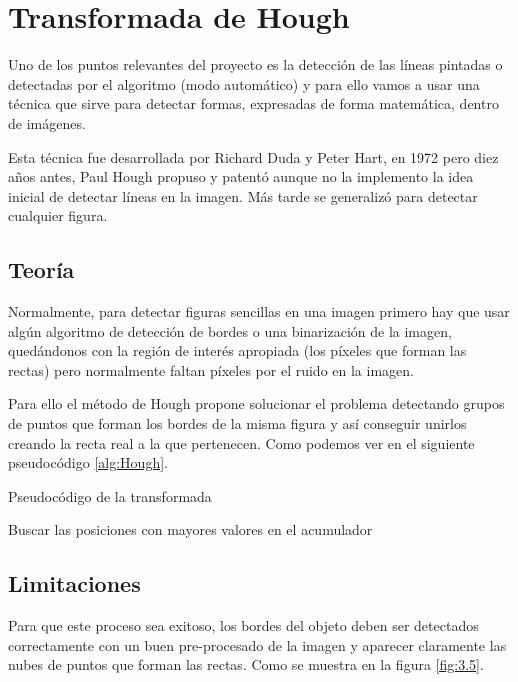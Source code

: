 \section{Transformada de Hough }
Uno de los puntos relevantes del proyecto es la detección de las líneas pintadas o detectadas por el algoritmo (modo automático) y para ello vamos a usar una técnica que sirve para detectar formas, expresadas de forma matemática, dentro de imágenes.

Esta técnica fue desarrollada por Richard Duda y Peter Hart, en 1972 pero diez años antes, Paul Hough \cite{pat:patHough} propuso y patentó aunque no la implemento la idea inicial de detectar líneas en la imagen.
Más tarde se generalizó para detectar cualquier figura.

\subsection{Teoría}

Normalmente, para detectar figuras sencillas en una imagen primero hay que usar algún algoritmo de detección de bordes o una binarización de la imagen, quedándonos con la región de interés apropiada (los píxeles que forman las rectas) pero normalmente faltan píxeles por el ruido en la imagen.

Para ello el método de Hough propone solucionar el problema detectando grupos de puntos que forman los bordes de la misma figura y así conseguir unirlos creando la recta real a la que pertenecen. Como podemos ver en el siguiente pseudocódigo 
\ref{alg:Hough}.

\label{alg:Hough}
\begin{algorithm*}
\caption{Pseudocódigo de la transformada}
\DontPrintSemicolon
{}


Buscar las posiciones con mayores valores en el acumulador\;	

\end{algorithm*}

\subsection{Limitaciones}
Para que este proceso sea exitoso, los bordes del objeto deben ser detectados correctamente con un buen pre-procesado de la imagen y aparecer claramente las nubes de puntos que forman las rectas.
Como se muestra en la figura \ref{fig:3.5}.


